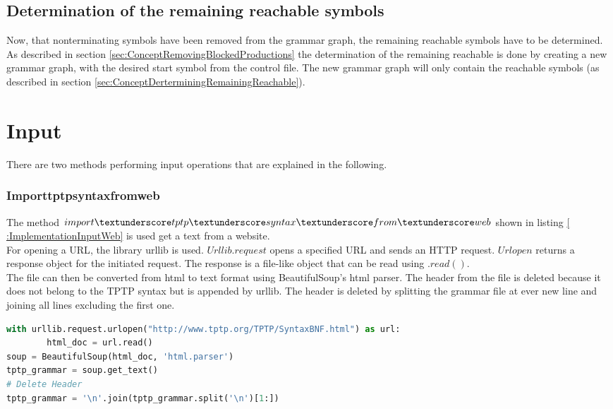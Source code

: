 \subsection{Determination of the remaining reachable symbols}

Now, that nonterminating symbols have been removed from the grammar graph, the remaining reachable symbols have to be determined.
As described in section \ref{sec:ConceptRemovingBlockedProductions} the determination of the remaining reachable is done by creating a new grammar graph, with the desired start symbol from the control file.
The new grammar graph will only contain the reachable symbols (as described in section \ref{sec:ConceptDerterminingRemainingReachable}). 

\section{Input}\label{sec:ImplementationInput}

There are two methods performing input operations that are explained in the following. 

\subsubsection{Import\textunderscore tptp\textunderscore syntax\textunderscore from\textunderscore web}

The method $import\textunderscore tptp\textunderscore syntax\textunderscore from\textunderscore web$ shown in listing \ref{
:ImplementationInputWeb} is used get a text from a website. \\
For opening a \ac{URL}, the library urllib is used. $Urllib.request$ opens a specified \ac{URL} and sends an HTTP request. $Urlopen$ returns a response object for the initiated request. The response is a file-like object that can be read using $.read()$. \cite{urllib} \\
The file can then be converted from html to text format using BeautifulSoup's html parser.
The header from the file is deleted because it does not belong to the \ac{TPTP} syntax but is appended by urllib. The header is deleted by splitting the grammar file at ever new line and joining all lines excluding the first one. \\

\begin{lstlisting}[language=Python, basicstyle=\scriptsize	,caption= Import TPTP syntax from web,label= lst:ImplementationInputWeb]
with urllib.request.urlopen("http://www.tptp.org/TPTP/SyntaxBNF.html") as url:
        html_doc = url.read()
soup = BeautifulSoup(html_doc, 'html.parser')
tptp_grammar = soup.get_text()
# Delete Header
tptp_grammar = '\n'.join(tptp_grammar.split('\n')[1:])
\end{lstlisting}

